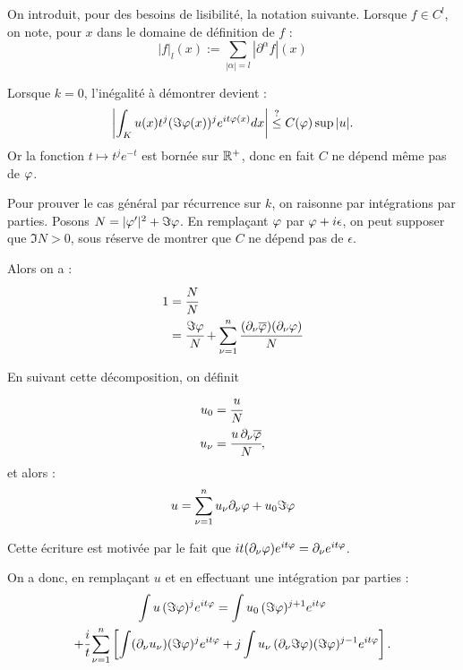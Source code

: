   On introduit, pour des besoins de lisibilité, la notation suivante. Lorsque $f \in C^l$, on note, pour $x$ dans le domaine de définition de $f$ :
  \begin{equation*}
    |f|_l(x) := \sum_{|\alpha|=l}|\partial^{\alpha}f|(x)
  \end{equation*}
  
  Lorsque $k=0$, l'inégalité à démontrer devient :
\begin{equation*}
  \left|\int_K u(x)t^{j}(\Im \varphi(x))^j e^{it\varphi(x)}dx\right| \stackrel{?}{\leq} 
    C(\varphi) \sup |u|.
\end{equation*}
\noindent Or la fonction $t \mapsto t^je^{-t}$ est bornée sur $\mathbb{R}^+$, donc en fait $C$ ne dépend même pas de $\varphi$.

Pour prouver le cas général par récurrence sur $k$, on raisonne par intégrations par parties. Posons $N=|\varphi'|^2+\Im\varphi$. En remplaçant $\varphi$ par $\varphi+i\epsilon$, on peut supposer que $\Im N > 0$, sous réserve de montrer que $C$ ne dépend pas de $\epsilon$.

Alors on a :
\begin{align*}
  1 &= \cfrac{N}{N}\\
  &= \cfrac{\Im \varphi}{N} + \sum_{\nu=1}^{n}\cfrac{(\partial_{\nu}
    \overline{\varphi})(\partial_{\nu}
    \varphi)}{N}
\end{align*}

\noindent En suivant cette décomposition, on définit 
\begin{align*}
u_0&=\cfrac{u}{N}\\
u_{\nu} &= \cfrac{u\,\partial_{\nu}\overline{\varphi}}{N},
\end{align*}
\noindent et alors :
    \begin{equation*}
      u = \sum_{\nu = 1}^{n}u_{\nu}\partial_{\nu} \varphi + u_0 \Im \varphi
    \end{equation*}

\noindent Cette écriture est motivée par le fait que $it(\partial_{\nu}
\varphi)e^{it\varphi} = \partial_{\nu} e^{it\varphi}$.

On a donc, en remplaçant $u$ et en effectuant une intégration par parties :
\begin{multline*}
  \int u\,(\Im\varphi)^je^{it\varphi} = \int u_0\,(\Im\varphi)^{j+1}e^{it\varphi} \\+
  \cfrac{i}{t} \sum_{\nu=1}^{n}\left[\int (\partial_{\nu}u_{\nu})(\Im
    \varphi)^je^{it\varphi} + j\int u_{\nu}\,(\partial_{\nu}\Im \varphi)(\Im \varphi)^{j-1}e^{it\varphi}\right].
\end{multline*}


